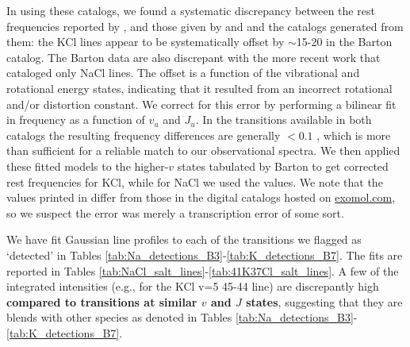 \documentclass[twocolumn]{aastex62}
\newcommand{\referee}[1]{\textbf{#1}}
\begin{document}
In using these catalogs, we found a systematic discrepancy between the rest
frequencies reported by \citet{Barton2014a}, and those given by
\citet{Caris2004a} and \citet{Caris2002a} and the catalogs generated from them:
the KCl lines appear to be systematically offset by $\sim$15-20 \kms in the
Barton catalog.  The Barton data are also discrepant with the more recent
\citet{Cabezas2016a} work that cataloged only NaCl lines. The offset is a
function of the vibrational and rotational energy states, indicating that it
resulted from an incorrect rotational and/or distortion constant.  We correct
for this error by performing a bilinear fit in frequency as a function of $v_u$
and $J_u$.  In the transitions available in both catalogs the resulting
frequency differences are generally $<0.1$ \kms, which is more than sufficient
for a reliable match to our observational spectra.  We then applied these
fitted models to the higher-$v$ states tabulated by Barton to get corrected
rest frequencies for KCl, while for NaCl we used the \citet{Cabezas2016a}
values.  We note that the values printed in \citet{Barton2014a} differ from
those in the digital catalogs hosted on \url{exomol.com}, so we suspect the
error was merely a transcription error of some sort.


%
%
%








We have fit Gaussian line profiles to each of the transitions we flagged as
`detected' in Tables \ref{tab:Na_detections_B3}-\ref{tab:K_detections_B7}.
The fits are reported in Tables
\ref{tab:NaCl_salt_lines}-\ref{tab:41K37Cl_salt_lines}.  
A few of the integrated intensities (e.g., for the KCl v=5 45-44 line) are discrepantly
high \referee{compared to transitions at similar $v$ and $J$ states},
suggesting that they are blends with other species as denoted in Tables
\ref{tab:Na_detections_B3}-\ref{tab:K_detections_B7}.
\end{document}
